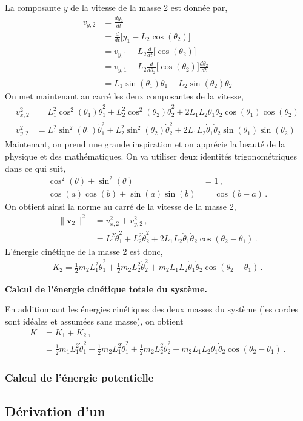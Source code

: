\documentclass[titlepage]{article}
\theoremstyle{cleanremark}
\begin{document}
\noindent La composante $y$ de la vitesse de la masse 2 est donnée par, 
\begin{align}
    v_{y, 2} &= \frac{d y_2}{dt}
    \\
    &= \frac{d}{dt}\bigg[y_1 - L_2\cos(\theta_2)\bigg]
    \\
    &=v_{y, 1} - L_2\frac{d}{dt}\bigg[\cos(\theta_2)\bigg]
    \\
    &=v_{y, 1} - L_2\frac{d}{d \theta_2}\bigg[\cos(\theta_2)\bigg]\frac{d\theta_2}{dt}
    \\
    &=L_1\sin(\theta_1)\dot{\theta}_1 +L_2\sin(\theta_2)\dot{\theta}_2
\end{align}
On met maintenant au carré les deux composantes de la vitesse, 
\begin{align}
    v^2_{x, 2} &=L_1^2\cos^2(\theta_1)\dot{\theta}_1^2 + L_2^2\cos^2(\theta_2)\dot{\theta}^2_2 + 2L_1L_2\dot{\theta}_1\dot{\theta}_2\cos(\theta_1)\cos(\theta_2)
    \\
    v^2_{y, 2} &=L_1^2\sin^2(\theta_1)\dot{\theta}_1^2 + L_2^2\sin^2(\theta_2)\dot{\theta}^2_2 + 2L_1L_2\dot{\theta}_1\dot{\theta}_2\sin(\theta_1)\sin(\theta_2)
\end{align}
Maintenant, on prend une grande inspiration et on apprécie la beauté de la physique et des mathématiques. On va utiliser deux identités trigonométriques dans ce qui suit, 
\begin{align}
    \cos^2(\theta) + \sin^2(\theta)&=1\, ,
    \\
    \cos(a)\cos(b)+\sin(a)\sin(b)&=\cos(b-a)\, .
\end{align}
On obtient ainsi la norme au carré de la vitesse de la masse 2, 
\begin{align}
    \lVert \mathbf{v}_2\rVert^2 &= v_{x,2}^2 + v_{y, 2}^2\, ,\\
    &=L_1^2\dot{\theta}_1^2 + L_2^2\dot{\theta}_2^2 +2L_1L_2 \dot{\theta}_1\dot{\theta}_2\cos(\theta_2-\theta_1)\, .
\end{align}
L'énergie cinétique de la masse 2 est donc, 
\begin{align}
    K_2 = \frac{1}{2}m_2L_1^2\dot{\theta}_1^2 + \frac{1}{2}m_2L_2^2\dot{\theta}_2^2 +m_2L_1L_2 \dot{\theta}_1\dot{\theta}_2\cos(\theta_2-\theta_1)\, .
\end{align}

\noindent\textbf{Calcul de l'énergie cinétique totale du système.}

\noindent En additionnant les énergies cinétiques des deux masses du système (les cordes sont idéales et assumées sans masse), on obtient
\begin{align}
    K &=K_1 + K_2 \, ,
    \\
    &= \frac{1}{2}m_1L_1^2 \dot{\theta}_1^2+\frac{1}{2}m_2L_1^2\dot{\theta}_1^2 + \frac{1}{2}m_2L_2^2\dot{\theta}_2^2 +m_2L_1L_2 \dot{\theta}_1\dot{\theta}_2\cos(\theta_2-\theta_1)\, .
\end{align}

\subsubsection{Calcul de l'énergie potentielle}


\subsection{Dérivation d'un }

\subsection{}
\end{document}
